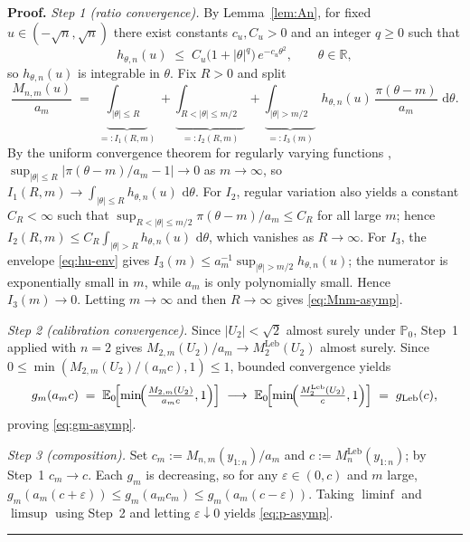 \documentclass{article}%
\newenvironment{proof}[1][Proof]{\noindent\textbf{#1.} }{\ \rule{0.5em}{0.5em}}
\newcommand{\R}{\mathbb{R}}
\newcommand{\E}{\mathbb{E}}
\newcommand{\Prob}{\mathbb{P}}
\newcommand{\dd}{\,\mathrm{d}}
\newcommand{\Leb}{\mathrm{Leb}}
\begin{document}
\begin{proof}
\emph{Step 1 (ratio convergence).}
By Lemma~\ref{lem:An}, for fixed \(u\in(-\sqrt n,\sqrt n)\) there
exist constants \(c_u,C_u>0\) and an integer \(q\geq 0\) such that
\begin{equation}\label{eq:hu-env}
  h_{\theta,n}(u)\;\leq\; C_u\bigl(1+|\theta|^q\bigr)\,e^{-c_u\theta^2},
  \qquad\theta\in\R,
\end{equation}
so \(h_{\theta,n}(u)\) is integrable in \(\theta\). Fix \(R>0\) and
split
\[
  \frac{M_{n,m}(u)}{a_m}
  \;=\;\underbrace{\int_{|\theta|\leq R}}_{=:I_1(R,m)}
   +\underbrace{\int_{R<|\theta|\leq m/2}}_{=:I_2(R,m)}
   +\underbrace{\int_{|\theta|>m/2}}_{=:I_3(m)}\;
   h_{\theta,n}(u)\,\frac{\pi(\theta-m)}{a_m}\,\dd\theta.
\]
By the uniform convergence theorem for regularly varying functions
\cite[Theorem~1.2.1]{Bingham1987},
\(\sup_{|\theta|\leq R}|\pi(\theta-m)/a_m-1|\to 0\) as
\(m\to\infty\), so
\(I_1(R,m)\to\int_{|\theta|\leq R}h_{\theta,n}(u)\,\dd\theta\). For
\(I_2\), regular variation also yields a constant \(C_R<\infty\) such
that \(\sup_{R<|\theta|\leq m/2}\pi(\theta-m)/a_m\leq C_R\) for all
large \(m\); hence
\(I_2(R,m)\leq C_R\int_{|\theta|>R}h_{\theta,n}(u)\,\dd\theta\), which
vanishes as \(R\to\infty\). For \(I_3\), the envelope \eqref{eq:hu-env}
gives
\(I_3(m)\leq a_m^{-1}\sup_{|\theta|>m/2}h_{\theta,n}(u)\); the
numerator is exponentially small in \(m\), while \(a_m\) is only
polynomially small. Hence \(I_3(m)\to 0\). Letting \(m\to\infty\) and
then \(R\to\infty\) gives \eqref{eq:Mnm-asymp}.

\emph{Step 2 (calibration convergence).}
Since \(|U_2|<\sqrt 2\) almost surely under \(\Prob_0\), Step~1 applied
with \(n=2\) gives
\(M_{2,m}(U_2)/a_m\to M_2^{\Leb}(U_2)\) almost surely. Since
\(0\leq\min(M_{2,m}(U_2)/(a_m c),1)\leq 1\), bounded convergence
yields
\[
  g_m(a_m c)
  \;=\;\E_0\!\Bigl[\min\!\Bigl(\tfrac{M_{2,m}(U_2)}{a_mc},1\Bigr)\Bigr]
  \;\longrightarrow\;
  \E_0\!\Bigl[\min\!\Bigl(\tfrac{M_2^{\Leb}(U_2)}{c},1\Bigr)\Bigr]
  \;=\;g_{\Leb}(c),
\]
proving \eqref{eq:gm-asymp}.

\emph{Step 3 (composition).}
Set \(c_m:=M_{n,m}(y_{1:n})/a_m\) and \(c:=M_n^{\Leb}(y_{1:n})\); by
Step~1 \(c_m\to c\). Each \(g_m\) is decreasing, so for any
\(\varepsilon\in(0,c)\) and \(m\) large,
\(g_m(a_m(c+\varepsilon))\leq g_m(a_m c_m)\leq g_m(a_m(c-\varepsilon))\).
Taking \(\liminf\) and \(\limsup\) using Step~2 and letting
\(\varepsilon\downarrow 0\) yields \eqref{eq:p-asymp}.
\end{proof}
\end{document}
